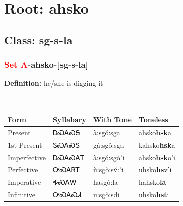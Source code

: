 \needspace{4in}
\section*{Root: ahsko}
\nopagebreak
{}
\needspace{3in}
\subsection*{Class: sg-s-la}
\nopagebreak
\needspace{2in}
\subsubsection*{\textcolor{Red}{Set A}{-}\textbf{ahsko}{-}[sg-s-la]}
\nopagebreak
\textbf{Definition: } he/she is digging it
\\[0.5em]
\begin{tabularx}{\textwidth}{l X X X}%
\toprule%
\textbf{Form}&\textbf{Syllabary}&\textbf{With Tone}&\textbf{Toneless}\\%
\midrule%
Present&ᎠᏍᎪᏍᎦ&à:sgǒ:sga&ahsko\textbf{hsk}a\\%
1st Present&ᎦᏍᎪᏍᎦ&gà:sgǒ:sga&kahsko\textbf{hsk}a\\%
Imperfective&ᎠᏍᎪᏍᎪᎢ&à:sgǒ:sgó’i&ahsko\textbf{hsk}o'i\\%
Perfective&ᎤᏍᎪᏒᎢ&ù:sgǒ:sv́:’i&uhsko\textbf{hs}v'i\\%
Imperative&ᎭᏍᎪᎳ&hasgǒ:la&hahsko\textbf{la}\\%
Infinitive&ᎤᏍᎪᏍᏗ&u:sgǒ:sdi&uhsko\textbf{hst}i\\%
\bottomrule%
\end{tabularx}
\\[1em]